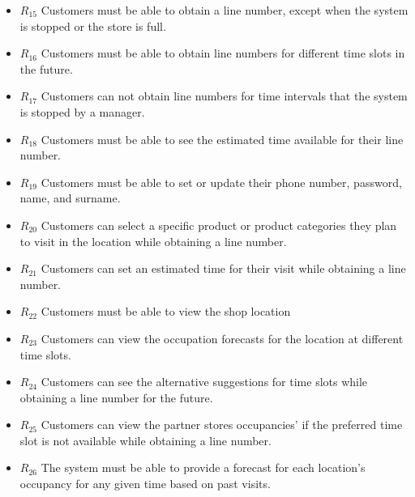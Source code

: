 \begin{itemize}
    \item \textbf{$R_{15}$} Customers must be able to obtain a line number, except when the system is stopped or the store is full.
    \item \textbf{$R_{16}$} Customers must be able to obtain line numbers for different time slots in the future.
    \item \textbf{$R_{17}$} Customers can not obtain line numbers for time intervals that the system is stopped by a manager.
    \item \textbf{$R_{18}$} Customers must be able to see the estimated time available for their line number.
    \item \textbf{$R_{19}$} Customers must be able to set or update their phone number, password, name, and surname.
    \item \textbf{$R_{20}$} Customers can select a specific product or product categories they plan to visit in the location while obtaining a line number.
    \item \textbf{$R_{21}$} Customers can set an estimated time for their visit while obtaining a line number.
    \item \textbf{$R_{22}$} Customers must be able to view the shop location
    \item \textbf{$R_{23}$} Customers can view the occupation forecasts for the location at different time slots.
    \item \textbf{$R_{24}$} Customers can see the alternative suggestions for time slots while obtaining a line number for the future.
    \item \textbf{$R_{25}$} Customers can view the partner stores occupancies' if the preferred time slot is not available while obtaining a line number.
    \item \textbf{$R_{26}$} The system must be able to provide a forecast for each location's occupancy for any given time based on past visits.
\end{itemize}


